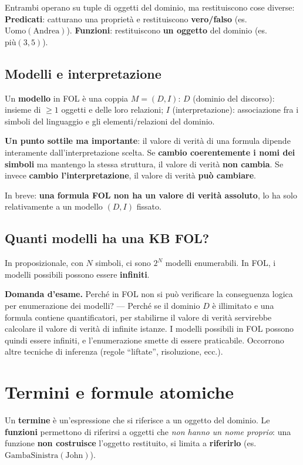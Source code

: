 \documentclass[11pt,a4paper]{report}
\newcommand{\domandaesame}[1]{\begin{esame}\textbf{Domanda d'esame.} #1\end{esame}}
\begin{document}
Entrambi operano su tuple di oggetti del dominio, ma restituiscono cose diverse: \textbf{Predicati}: catturano una proprietà e restituiscono \textbf{vero/falso} (es.\ $\text{Uomo}(\text{Andrea})$). \textbf{Funzioni}: restituiscono \textbf{un oggetto} del dominio (es.\ $\text{più}(3,5)$).

\subsection*{Modelli e interpretazione}

Un \textbf{modello} in FOL è una coppia $M=(D,I)$: $D$ (dominio del discorso): insieme di $\ge 1$ oggetti e delle loro relazioni; $I$ (interpretazione): associazione fra i simboli del linguaggio e gli elementi/relazioni del dominio.

\textbf{Un punto sottile ma importante}: il valore di verità di una formula dipende interamente dall'interpretazione scelta. Se \textbf{cambio coerentemente i nomi dei simboli} ma mantengo la stessa struttura, il valore di verità \textbf{non cambia}. Se invece \textbf{cambio l'interpretazione}, il valore di verità \textbf{può cambiare}.

In breve: \textbf{una formula FOL non ha un valore di verità assoluto}, lo ha solo relativamente a un modello $(D,I)$ fissato.

\subsection*{Quanti modelli ha una KB FOL?}

In proposizionale, con $N$ simboli, ci sono $2^N$ modelli enumerabili. In FOL, i modelli possibili possono essere \textbf{infiniti}.

\domandaesame{Perché in FOL non si può verificare la conseguenza logica per enumerazione dei modelli? --- Perché se il dominio $D$ è illimitato e una formula contiene quantificatori, per stabilirne il valore di verità servirebbe calcolare il valore di verità di infinite istanze. I modelli possibili in FOL possono quindi essere infiniti, e l'enumerazione smette di essere praticabile. Occorrono altre tecniche di inferenza (regole ``liftate'', risoluzione, ecc.).}

\section{Termini e formule atomiche}

Un \textbf{termine} è un'espressione che si riferisce a un oggetto del dominio. Le \textbf{funzioni} permettono di riferirsi a oggetti che \emph{non hanno un nome proprio}: una funzione \textbf{non costruisce} l'oggetto restituito, si limita a \textbf{riferirlo} (es.\ $\text{GambaSinistra}(\text{John})$).
\end{document}
